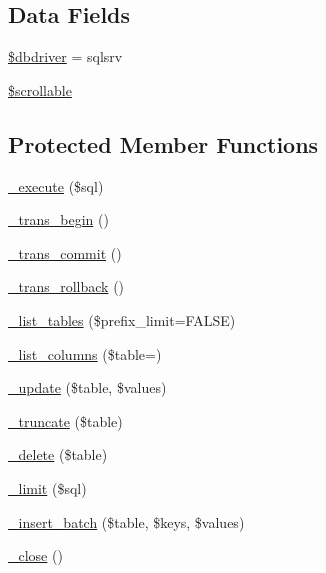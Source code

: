 \subsection*{Data Fields}
\begin{DoxyCompactItemize}
\item 
\mbox{\hyperlink{class_c_i___d_b__sqlsrv__driver_a0cde2a16322a023d040aa7f725877597}{\$dbdriver}} = \textquotesingle{}sqlsrv\textquotesingle{}
\item 
\mbox{\hyperlink{class_c_i___d_b__sqlsrv__driver_a76095eacf021915db9aabc44ecf58555}{\$scrollable}}
\end{DoxyCompactItemize}
\subsection*{Protected Member Functions}
\begin{DoxyCompactItemize}
\item 
\mbox{\hyperlink{class_c_i___d_b__sqlsrv__driver_a114ab675d89bf8324a41785fb475e86d}{\+\_\+execute}} (\$sql)
\item 
\mbox{\hyperlink{class_c_i___d_b__sqlsrv__driver_ac81ac882c1d54347d810199a15856aac}{\+\_\+trans\+\_\+begin}} ()
\item 
\mbox{\hyperlink{class_c_i___d_b__sqlsrv__driver_a6fe7f373e0b11cfae23a5f41c0b35dda}{\+\_\+trans\+\_\+commit}} ()
\item 
\mbox{\hyperlink{class_c_i___d_b__sqlsrv__driver_ad49a116b0776c26b53114c9093fd102a}{\+\_\+trans\+\_\+rollback}} ()
\item 
\mbox{\hyperlink{class_c_i___d_b__sqlsrv__driver_a435c0f3ce54fe7daa178baa8532ebd54}{\+\_\+list\+\_\+tables}} (\$prefix\+\_\+limit=F\+A\+L\+SE)
\item 
\mbox{\hyperlink{class_c_i___d_b__sqlsrv__driver_a7ccb7f9c301fe7f0a9db701254142b63}{\+\_\+list\+\_\+columns}} (\$table=\textquotesingle{}\textquotesingle{})
\item 
\mbox{\hyperlink{class_c_i___d_b__sqlsrv__driver_a2540b03a93fa73ae74c10d0e16fc073e}{\+\_\+update}} (\$table, \$values)
\item 
\mbox{\hyperlink{class_c_i___d_b__sqlsrv__driver_aa029600528fc1ce660a23ff4b4667f95}{\+\_\+truncate}} (\$table)
\item 
\mbox{\hyperlink{class_c_i___d_b__sqlsrv__driver_a133ea8446ded52589bd22cc9163d0896}{\+\_\+delete}} (\$table)
\item 
\mbox{\hyperlink{class_c_i___d_b__sqlsrv__driver_a3a02ea06541b8ecc25a33a61651562c8}{\+\_\+limit}} (\$sql)
\item 
\mbox{\hyperlink{class_c_i___d_b__sqlsrv__driver_a1978e1358c812587a46e242630365099}{\+\_\+insert\+\_\+batch}} (\$table, \$keys, \$values)
\item 
\mbox{\hyperlink{class_c_i___d_b__sqlsrv__driver_a4d9082658000e5ede8312067c6dda9db}{\+\_\+close}} ()
\end{DoxyCompactItemize}
